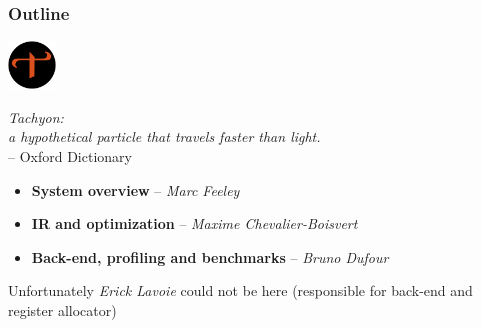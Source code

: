 \begin{frame}
\frametitle{\bf Outline}

  \includegraphics[height=0.5in]{images/tachyon-icon.png}
  \begin{minipage}[b]{3.5in}
    \begin{center}
      {\em Tachyon:~~~~~~~~~~~~~~~~~~~~~~~~~~~~~~~~~~~~~~~~~~~~~~~~~~~~~~~~~\\ a hypothetical particle that travels faster than light.} \\
      -- Oxford Dictionary
    \end{center}
  \end{minipage}

  \bigskip

  \begin{itemize}

  \item {\bf System overview} -- {\em Marc Feeley}
    \smallskip

  \item {\bf IR and optimization} -- {\em Maxime Chevalier-Boisvert}
    \smallskip

  \item {\bf Back-end, profiling and benchmarks} -- {\em Bruno Dufour}
    \smallskip

  \end{itemize}

  \bigskip
  \bigskip

  Unfortunately {\em Erick Lavoie} could not be here (responsible
  for back-end and register allocator)

\end{frame}

